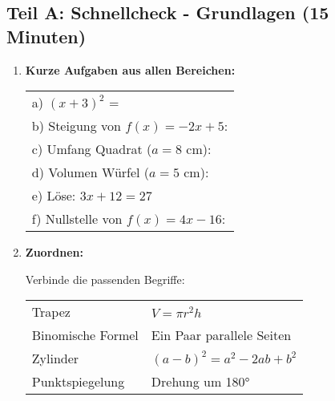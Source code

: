 \subsection*{Teil A: Schnellcheck - Grundlagen (15 Minuten)}

\begin{enumerate}[label=\arabic*.]

    \item \textbf{Kurze Aufgaben aus allen Bereichen:}

    \begin{tabular}{l}
        a) $(x + 3)^2$ = \underline{\hspace{4cm}} \\[2ex]
        b) Steigung von $f(x) = -2x + 5$: \underline{\hspace{2cm}} \\[2ex]
        c) Umfang Quadrat ($a = 8$ cm): \underline{\hspace{3cm}} \\[2ex] 
        d) Volumen Würfel ($a = 5$ cm): \underline{\hspace{3cm}} \\[2ex]
        e) Löse: $3x + 12 = 27$ \underline{\hspace{4cm}} \\[2ex]
        f) Nullstelle von $f(x) = 4x - 16$: \underline{\hspace{3cm}}
    \end{tabular}

    \vspace{1cm}

    \item \textbf{Zuordnen:}

    Verbinde die passenden Begriffe:

    \begin{tabular}{ll}
        Trapez & \hspace{3cm} $V = \pi r^2 h$ \\[0.5cm]
        Binomische Formel & \hspace{3cm} Ein Paar parallele Seiten \\[0.5cm]
        Zylinder & \hspace{3cm} $(a-b)^2 = a^2 - 2ab + b^2$ \\[0.5cm]
        Punktspiegelung & \hspace{3cm} Drehung um 180° \\
    \end{tabular}

\end{enumerate}